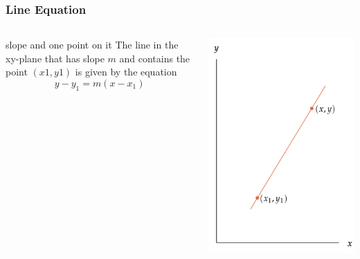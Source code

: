 \documentclass{beamer}
\begin{document}
\begin{frame}
  \frametitle{Line Equation}
  \begin{columns} 
  \begin{alertblock}{slope and one point on it}
    The line in the xy-plane that has slope \(m\) and contains the point \((x1, y1)\) is given
by the equation 
\[y - y_{1} = m(x  -  x_{1})\]
  \end{alertblock}

  \centering
  \includegraphics[width=0.8\linewidth]{line1.png} %
  \end{columns}

\end{frame}
\end{document}
